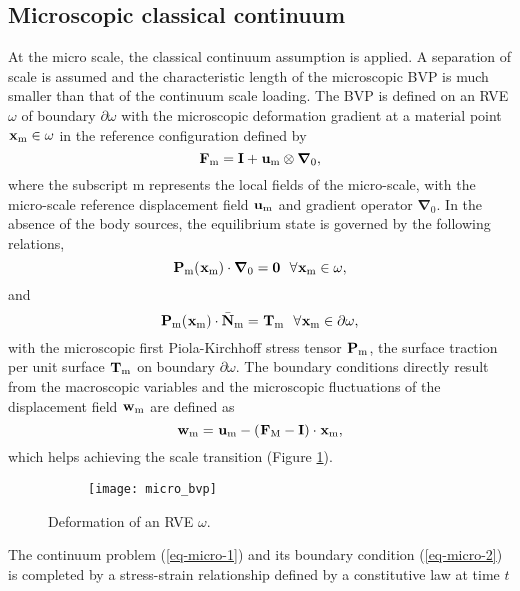 \subsection{Microscopic classical continuum}\label{ch-form-micro}
At the micro scale, the classical continuum assumption is applied. A separation of scale is assumed and the characteristic length of the microscopic BVP is much smaller than that of the continuum scale loading. The BVP is defined on an RVE $ \omega $ of boundary $ \partial\omega $ with the microscopic deformation gradient at a material point $ \tgmm[]{x}\in\omega $ in the reference configuration defined by
\begin{equation}\label{eq-micro-0-1}
\tgmm[]{F}=\textbf{I}+\tgmm[]{u}\otimes\bm\nabla_0,
\end{equation}
where the subscript m represents the local fields of the micro-scale, with the micro-scale reference  displacement field $ \tgmm[]{u} $ and gradient operator $ \bm\nabla_0 $. In the absence of the body sources, the equilibrium state is governed by the following relations,
\begin{equation}\label{eq-micro-1}
\tgmm[]{P}(\tgmm[]{x})\cdot\bm\nabla_0=\bm{0}\,\,\,\,\forall\tgmm[]{x}\in\omega,
\end{equation}
and
\begin{equation}\label{eq-micro-1-1}
\tgmm[]{P}(\tgmm[]{x})\cdot\bar{\mathbf{N}}_\text{m}=\tgmm[]{T}\,\,\,\,\forall\tgmm[]{x}\in\partial\omega,
\end{equation}
with the microscopic first Piola-Kirchhoff stress tensor $ \tgmm[]{P} $, the surface traction per unit surface $ \tgmm[]{T} $ on boundary $ \partial\omega $.
The boundary conditions directly result from the macroscopic variables and the microscopic fluctuations of the displacement field $ \tgmm{w} $ are defined as
\begin{equation}\label{eq-micro-2}
\tgmm[]{w}=\tgmm[]{u}-\left(\tgm[]{F}-\textbf{I}\right)\cdot\tgmm[]{x},
\end{equation}
which helps achieving the scale transition (Figure \ref{fig-ch-micro}).
\begin{figure}
\centering
\begin{subfigure}[t]{0.75\textwidth}
	\texttt{[image: micro\_bvp]}
\end{subfigure}
\caption{Deformation of an RVE $ \omega $.}\label{fig-ch-micro}
\end{figure}
The continuum problem (\ref{eq-micro-1}) and its boundary condition (\ref{eq-micro-2}) is completed by a stress-strain relationship defined by a constitutive law at time $ t $
